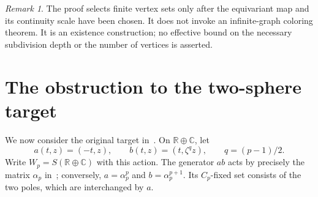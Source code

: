 \documentclass[11pt]{amsart}
\theoremstyle{definition}
\theoremstyle{remark}
\newtheorem{remark}[theorem]{Remark}
\numberwithin{equation}{section}
\newcommand{\R}{\mathbb R}
\newcommand{\C}{\mathbb C}
\begin{document}
\begin{remark}
The proof selects finite vertex sets only after the equivariant map and its continuity scale have been chosen. It does not invoke an infinite-graph coloring theorem. It is an existence construction; no effective bound on the necessary subdivision depth or the number of vertices is asserted.
\end{remark}

\section{The obstruction to the two-sphere target}\label{sec:obstruction}

We now consider the original target in~\cite[Lemma~2.6]{Raanes}. On $\R\oplus\C$, let
\begin{equation}\label{eq:old-action}
 a(t,z)=(-t,z),\qquad b(t,z)=(t,\zeta^qz),
 \qquad q=(p-1)/2.
\end{equation}
Write $W_p=S(\R\oplus\C)$ with this action. The generator $ab$ acts by precisely the matrix $\alpha_p$ in~\cite{Raanes}; conversely, $a=\alpha_p^p$ and $b=\alpha_p^{p+1}$. Its $C_p$-fixed set consists of the two poles, which are interchanged by $a$.
\end{document}
